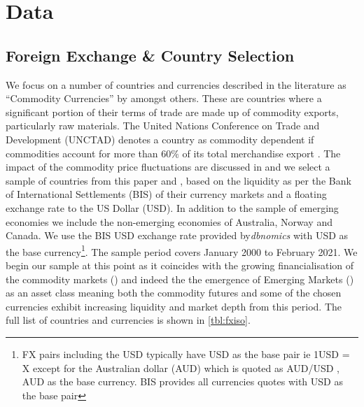 \section{Data}
\label{sec:data}
\subsection{Foreign Exchange \& Country Selection}
We focus on a number of countries and currencies described in the literature as ``Commodity Currencies'' by \cite{cocurrencies} amongst others. These are countries where a significant portion of their terms of trade are made up of commodity exports, particularly raw materials. The United Nations Conference on Trade and Development (UNCTAD) denotes a country as commodity dependent if commodities account for more than $60\%$ of its total merchandise export \cite{codependency}. The impact of the commodity price fluctuations are discussed in \cite{coboomexport} and we select a sample of countries from this paper and \cite{codependency}, based on the liquidity as per the Bank of International Settlements (BIS) \cite{bisturnover} of their currency markets and a floating exchange rate to the US Dollar (USD). In addition to the sample of emerging economies we include the non-emerging economies of Australia, Norway and Canada. We use the BIS USD exchange rate provided by\textit{dbnomics} \cite{dbnomics} with USD as the base currency\footnote{FX pairs including the USD typically have USD as the base pair ie 1USD = X except for the Australian dollar (AUD) which is quoted as AUD/USD , AUD as the base currency. BIS provides all currencies quotes with USD as the base pair}. The sample period covers January 2000 to February 2021. We begin our sample at this point as it coincides with the growing financialisation of the commodity markets (\cite{cofinancialisation}) and indeed the the emergence of Emerging Markets (\cite{EMasset}) as an asset class meaning both the commodity futures and some of the chosen currencies exhibit increasing liquidity and market depth from this period. The full list of countries and currencies is shown in \autoref{tbl:fxiso}.

